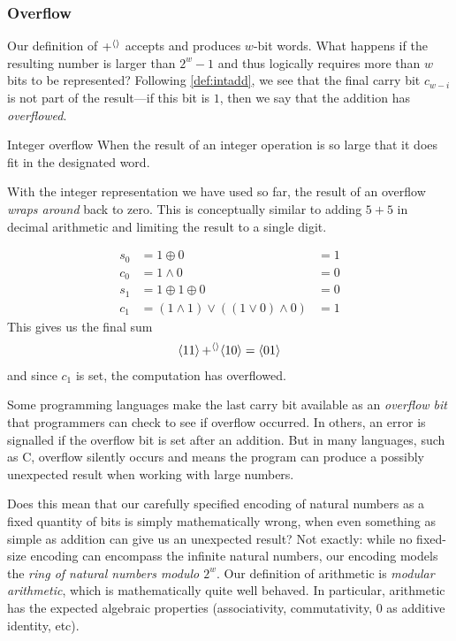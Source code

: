 \subsubsection{Overflow}

Our definition of $\operatorname{+^{\langle\rangle}}$ accepts and produces $w$-bit words.  What
happens if the resulting number is larger than $2^{w}-1$ and thus
logically requires more than $w$ bits to be represented?  Following
\cref{def:intadd}, we see that the final carry bit $c_{w-i}$ is not
part of the result---if this bit is $1$, then we say that the addition
has \emph{overflowed}.

\begin{definition}{Integer overflow}
  When the result of an integer operation is so large that it does fit
  in the designated word.
\end{definition}

With the integer representation we have used so far, the result of an
overflow \emph{wraps around} back to zero.  This is conceptually
similar to adding $5+5$ in decimal arithmetic and limiting the result
to a single digit.

\begin{example}
  \begin{align}
    s_{0} &= 1 \oplus 0 &= 1 \\
    c_{0} &= 1 \land 0 &= 0 \\
    s_{1} &= 1 \oplus 1 \oplus 0 &= 0 \\
    c_{1} &= (1 \land 1) \lor ((1\lor 0) \land 0) &= 1
  \end{align}
  This gives us the final sum
  \begin{align}
    \langle 11 \rangle \operatorname{+^{\langle\rangle}} \langle 10 \rangle = \langle 01 \rangle
  \end{align}
  and since $c_{1}$ is set, the computation has overflowed.
\end{example}

Some programming languages make the last carry bit available as an
\emph{overflow bit} that programmers can check to see if overflow
occurred.  In others, an error is signalled if the overflow bit is set
after an addition.  But in many languages, such as C, overflow
silently occurs and means the program can produce a possibly
unexpected result when working with large numbers.

Does this mean that our carefully specified encoding of natural
numbers as a fixed quantity of bits is simply mathematically wrong,
when even something as simple as addition can give us an unexpected
result?  Not exactly: while no fixed-size encoding can encompass the
infinite natural numbers, our encoding models the \emph{ring
  of natural numbers modulo $2^{w}$}.  Our definition of arithmetic is
\emph{modular arithmetic}, which is mathematically quite well behaved.
In particular, arithmetic has the expected algebraic properties
(associativity, commutativity, $0$ as additive identity, etc).

